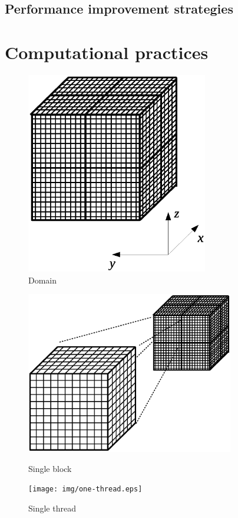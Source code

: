 \documentclass{article}
\begin{document}
    \subsection{Performance improvement strategies}

\section{Computational practices}

\begin{figure}[h]
\begin{center}
\includegraphics[trim={{100pt} {150pt} {100pt} {150pt}}, clip, height=250pt]{img/domain.eps}
\end{center}
\caption{Domain}
\label{fig:domain}
\end{figure}

\begin{figure}[ht]
\begin{minipage}[b]{0.45\linewidth}
\centering
\includegraphics[trim={{50pt} {150pt} {50pt} {150pt}}, clip, height=200pt]{img/one-block.eps}
\caption{Single block}
\label{fig:one-block}
\end{minipage}
\hspace{0.5cm}
\begin{minipage}[b]{0.45\linewidth}
\centering
\texttt{[image: img/one-thread.eps]}
\caption{Single thread}
\label{fig:one-line}
\end{minipage}
\end{figure}
\end{document}

